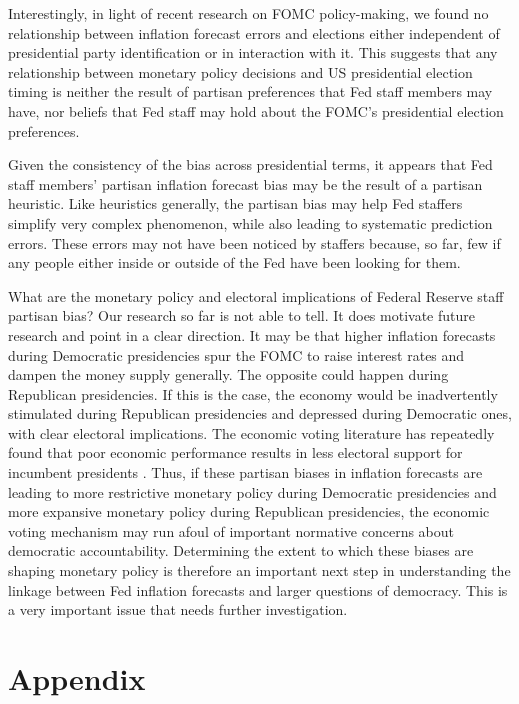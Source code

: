 \documentclass[a4paper]{article}\usepackage{graphicx, color}
\begin{document}
Interestingly, in light of recent research on FOMC policy-making, we found no relationship between inflation forecast errors and elections either independent of presidential party identification or in interaction with it. This suggests that any relationship between monetary policy decisions and US presidential election timing is neither the result of partisan preferences that Fed staff members may have, nor beliefs that Fed staff may hold about the FOMC's presidential election preferences. 

Given the consistency of the bias across presidential terms, it appears that Fed staff members' partisan inflation forecast bias may be the result of a partisan heuristic. Like heuristics generally, the partisan bias may help Fed staffers simplify very complex phenomenon, while also leading to systematic prediction errors. These errors may not have been noticed by staffers because, so far, few if any people either inside or outside of the Fed have been looking for them. 

What are the monetary policy and electoral implications of Federal Reserve staff partisan bias? Our research so far is not able to tell. It does motivate future research and point in a clear direction. It may be that higher inflation forecasts during Democratic presidencies spur the FOMC to raise interest rates and dampen the money supply generally. The opposite could happen during Republican presidencies. If this is the case, the economy would be inadvertently stimulated during Republican presidencies and depressed during Democratic ones, with clear electoral implications. The economic voting literature has repeatedly found that poor economic performance results in less electoral support for incumbent presidents \citep[e.g.][]{Bloom1975}. Thus, if these partisan biases in inflation forecasts are leading to more restrictive monetary policy during Democratic presidencies and more expansive monetary policy during Republican presidencies, the economic voting mechanism may run afoul of important normative concerns about democratic accountability. Determining the extent to which these biases are shaping monetary policy is therefore an important next step in understanding the linkage between Fed inflation forecasts and larger questions of democracy. This is a very important issue that needs further investigation.

\clearpage
\section*{Appendix}
\end{document}
